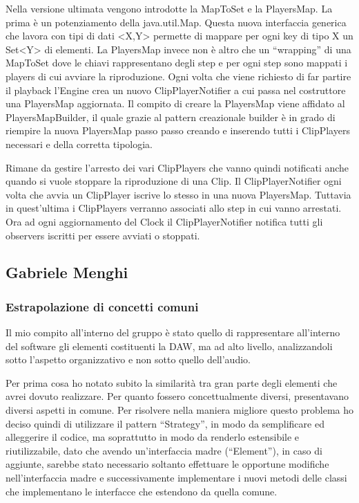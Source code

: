 \documentclass[a4paper,12pt]{report}
\begin{document}
Nella versione ultimata vengono introdotte la MapToSet e la PlayersMap. 
La prima è un potenziamento della java.util.Map. Questa nuova interfaccia generica che lavora con tipi di dati <X,Y> permette di mappare per ogni key di tipo X un Set<Y> di elementi.
La PlayersMap invece non è altro che un “wrapping” di una MapToSet dove le chiavi rappresentano degli step e per ogni step sono mappati i players di cui avviare la riproduzione.
Ogni volta che viene richiesto di far partire il playback l’Engine crea un nuovo ClipPlayerNotifier a cui passa nel costruttore una PlayersMap aggiornata.
Il compito di creare la PlayersMap viene affidato al PlayersMapBuilder, il quale grazie al pattern creazionale builder è in grado di riempire la nuova PlayersMap passo passo creando e inserendo tutti i ClipPlayers necessari e della corretta tipologia.

Rimane da gestire l’arresto dei vari ClipPlayers che vanno quindi notificati anche quando si vuole stoppare la riproduzione di una Clip.
Il ClipPlayerNotifier ogni volta che avvia un ClipPlayer iscrive lo stesso in una nuova PlayersMap. Tuttavia in quest’ultima i ClipPlayers verranno associati allo step in cui vanno arrestati.
Ora ad ogni aggiornamento del Clock il ClipPlayerNotifier notifica tutti gli observers iscritti per essere avviati o stoppati.
\endsubsubsection
\endsubsection

\subsection{Gabriele Menghi}
\subsubsection{Estrapolazione di concetti comuni}
Il mio compito all’interno del gruppo è stato quello di rappresentare all’interno del software gli elementi costituenti la DAW, ma ad alto livello, analizzandoli sotto l’aspetto organizzativo e non sotto quello dell’audio.

Per prima cosa ho notato subito la similarità tra gran parte degli elementi che avrei dovuto realizzare. Per quanto fossero concettualmente diversi, presentavano diversi aspetti in comune. Per risolvere nella maniera migliore questo problema ho deciso quindi di utilizzare il pattern “Strategy”, in modo da semplificare ed alleggerire il codice, ma soprattutto in modo da renderlo estensibile e riutilizzabile, dato che avendo un’interfaccia madre (“Element”), in caso di aggiunte, sarebbe stato necessario soltanto effettuare le opportune modifiche nell’interfaccia madre e successivamente implementare i nuovi metodi delle classi che implementano le interfacce che estendono da quella comune.
\end{document}
